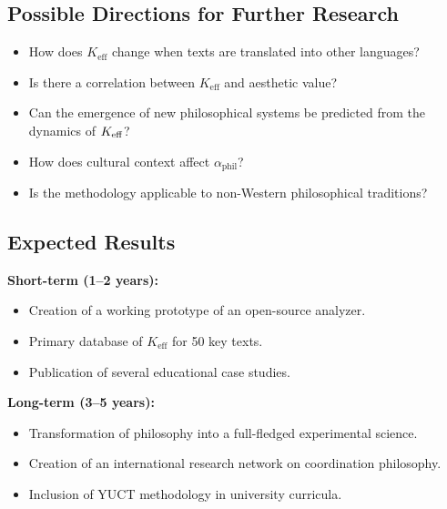 \documentclass[12pt,a4paper]{article}
\begin{document}
	\subsection{Possible Directions for Further Research}
	
	\begin{itemize}
		\item How does \(K_{\mathrm{eff}}\) change when texts are translated into other languages?
		\item Is there a correlation between \(K_{\mathrm{eff}}\) and aesthetic value?
		\item Can the emergence of new philosophical systems be predicted from the dynamics of \(\Keff\)?
		\item How does cultural context affect \(\alpha_{\text{phil}}\)?
		\item Is the methodology applicable to non-Western philosophical traditions?
	\end{itemize}
	
	\subsection{Expected Results}
	
	\textbf{Short-term (1–2 years):}
	\begin{itemize}
		\item Creation of a working prototype of an open-source analyzer.
		\item Primary database of \(K_{\mathrm{eff}}\) for 50 key texts.
		\item Publication of several educational case studies.
	\end{itemize}
	
	\textbf{Long-term (3–5 years):}
	\begin{itemize}
		\item Transformation of philosophy into a full-fledged experimental science.
		\item Creation of an international research network on coordination philosophy.
		\item Inclusion of YUCT methodology in university curricula.
	\end{itemize}
	
\end{document}
